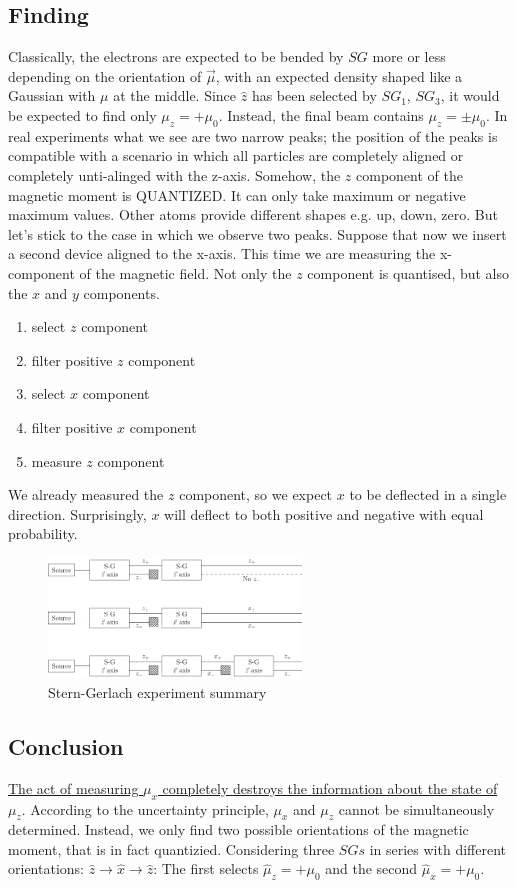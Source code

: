   \subsection{Finding}
  Classically, the electrons are expected to be bended by $SG$ more or less depending on the orientation of $\vec{\mu}$, with an expected density shaped like a Gaussian with $\mu$ at the middle.
  Since $\hat{z}$ has been selected by $SG_1$, $SG_3$, it would be expected to find only $\mu_z = + \mu_0$. Instead, the final beam contains $\mu_z =\pm \mu_0$.
\noindent
In real experiments what we see are two narrow peaks; the position of the peaks is compatible with a scenario in which all particles are completely aligned or completely unti-alinged with the z-axis. Somehow, the $z$ component of the magnetic moment is QUANTIZED. It can only take maximum or negative maximum values. Other atoms provide different shapes e.g. up, down, zero. But let’s stick to the case in which we observe two peaks.
Suppose that now we insert a second device aligned to the x-axis. This time we are measuring the x-component of the magnetic field. Not only the $z$ component is quantised, but also the $x$ and $y$ components.
\begin{enumerate}
  \item select $z$ component
  \item filter positive $z$ component
  \item select $x$ component
  \item filter positive $x$ component
  \item measure $z$ component
 \end{enumerate}
We already measured the $z$ component, so we expect $x$ to be deflected in a single direction. Surprisingly, $x$ will deflect to both positive and negative with equal probability. 

\begin{figure}[h!]
    \centering
    \includegraphics[clip, width=0.6\textwidth]{stern_ger.png}
    \caption{\label{fig:stern_ger} Stern-Gerlach experiment summary}
\end{figure}
  \subsection{Conclusion}
  \underline{The act of measuring $\mu_x$ completely destroys the information about the state of $\mu_z$}.
  According to the uncertainty principle, $\mu_x$ and $\mu_z$ cannot be simultaneously determined.
  Instead, we only find two possible orientations of the magnetic moment, that is in fact quantizied.
  Considering three $SGs$ in series with different orientations: $\hat{z}\rightarrow\hat{x}\rightarrow\hat{z}$:
  The first selects $\hat{\mu}_z = +\mu_0$ and the second $\hat{\mu}_x = +\mu_0$.


